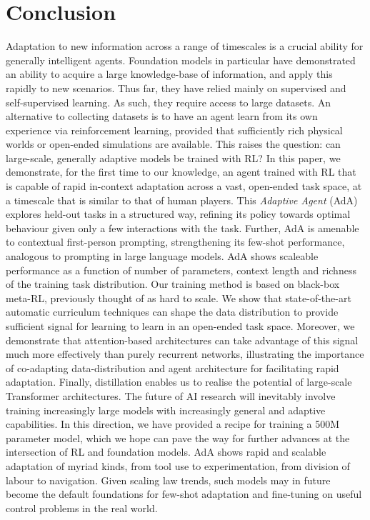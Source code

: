 \documentclass[11pt, a4paper, logo, copyright]{deepmind}
\begin{document}
\section{Conclusion}
Adaptation to new information across a range of timescales is a crucial ability for generally intelligent agents. Foundation models in particular have demonstrated an ability to acquire a large knowledge-base of information, and apply this rapidly to new scenarios. Thus far, they have relied mainly on supervised and self-supervised learning. As such, they require access to large datasets. An alternative to collecting datasets is to have an agent learn from its own experience via reinforcement learning, provided that sufficiently rich physical worlds or open-ended simulations are available. This raises the question: can large-scale, generally adaptive models be trained with RL?
In this paper, we demonstrate, for the first time to our knowledge, an agent trained with RL that is capable of rapid in-context adaptation across a vast, open-ended task space, at a timescale that is similar to that of human players. This \textit{Adaptive Agent} (AdA) explores held-out tasks in a structured way, refining its policy towards optimal behaviour given only a few interactions with the task. Further, AdA is amenable to contextual first-person prompting, strengthening its few-shot performance, analogous to prompting in large language models. AdA shows scaleable performance as a function of number of parameters, context length and richness of the training task distribution.
Our training method is based on black-box meta-RL, previously thought of as hard to scale. We show that state-of-the-art automatic curriculum techniques can shape the data distribution to provide sufficient signal for learning to learn in an open-ended task space. Moreover, we demonstrate that attention-based architectures can take advantage of this signal much more effectively than purely recurrent networks, illustrating the importance of co-adapting data-distribution and agent architecture for facilitating rapid adaptation. Finally, distillation enables us to realise the potential of large-scale Transformer architectures.
The future of AI research will inevitably involve training increasingly large models with increasingly general and adaptive capabilities. In this direction, we have provided a recipe for training a 500M parameter model, which we hope can pave the way for further advances at the intersection of RL and foundation models. AdA shows rapid and scalable adaptation of myriad kinds, from tool use to experimentation, from division of labour to navigation. Given scaling law trends, such models may in future become the default foundations for few-shot adaptation and fine-tuning on useful control problems in the real world.
\end{document}
